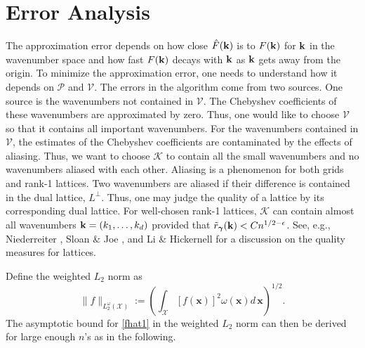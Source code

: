 \documentclass[article]{siamltex}
\def\bx{\boldsymbol x}
\def\bk{{\bf k}}
\def\bgam{{\boldsymbol \gamma }}
\def\calV {\mathcal {V}}
\def\K {\mathcal {K}}
\def\calP {\mathcal {P}}
\newcommand{\dint}{\displaystyle\int}
\newcommand{\abs}[1]{\left\vert#1\right\vert}
\begin{document}
\section{Error Analysis}
The approximation error depends on how close $\hat F(\bk)$ is to
$F(\bk)$ for $\bk$ in the wavenumber space and how fast $F(\bk)$
decays with $\bk$ as $\bk$ gets away from the origin. To minimize
the approximation error, one needs to understand how it depends on
$\calP$ and $\calV$. The errors in the algorithm come from two
sources. One source is the wavenumbers not contained in $\calV$.
The Chebyshev coefficients of these wavenumbers are approximated by
zero. Thus, one would like to choose $\calV$ so that it contains
all important wavenumbers.  For the wavenumbers contained in
$\calV$, the estimates of the Chebyshev coefficients are
contaminated by the effects of aliasing.  Thus, we want to choose
$\K$ to contain all the small wavenumbers and no wavenumbers
aliased with each other. Aliasing is a phenomenon for both grids
and rank-1 lattices.  Two wavenumbers are aliased if their
difference is contained in the dual lattice, $L^\perp$.  Thus, one
may judge the quality of a lattice by its corresponding dual
lattice.  For well-chosen rank-1 lattices, $\K$ can contain almost
all wavenumbers $\bk=(k_1, \ldots, k_d)$ provided that
$\tilde{r}_\bgam(\bk)< C n^{1/2-\epsilon}$. 
See, e.g., Niederreiter \cite{Niederreiter1992},
Sloan \& Joe \cite{SloJoe92}, and Li \& Hickernell \cite{LiHic03}
for a discussion on the quality measures for lattices.
 \smallskip


Define the weighted $L_2$ norm as
\begin{equation} \label{weiL2}
\|f\|_{L_2^{\omega}(\mathcal X)}:= \left(\dint_{\mathcal
X}[f(\bx)]^2 \omega (\bx)d\,\bx\right)^{1/2}.\end{equation}
The
asymptotic bound for \eqref{fhat1} in the weighted $L_2$ norm can
then be derived for large enough $n$'s as in the following.
\end{document}
